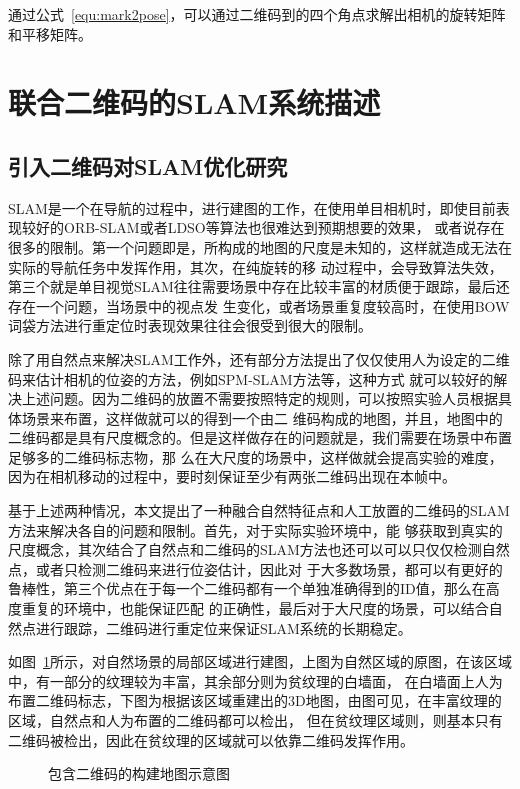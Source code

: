 通过公式~\ref{equ:mark2pose}，可以通过二维码到的四个角点求解出相机的旋转矩阵和平移矩阵。
\section{联合二维码的SLAM系统描述}
\label{sec:2.3}
\subsection{引入二维码对SLAM优化研究}
\label{sec:2.3.1}
SLAM是一个在导航的过程中，进行建图的工作，在使用单目相机时，即使目前表现较好的ORB-SLAM或者LDSO等算法也很难达到预期想要的效果，
或者说存在很多的限制。第一个问题即是，所构成的地图的尺度是未知的，这样就造成无法在实际的导航任务中发挥作用，其次，在纯旋转的移
动过程中，会导致算法失效，第三个就是单目视觉SLAM往往需要场景中存在比较丰富的材质便于跟踪，最后还存在一个问题，当场景中的视点发
生变化，或者场景重复度较高时，在使用BOW词袋方法进行重定位时表现效果往往会很受到很大的限制。

除了用自然点来解决SLAM工作外，还有部分方法提出了仅仅使用人为设定的二维码来估计相机的位姿的方法，例如SPM-SLAM方法等，这种方式
就可以较好的解决上述问题。因为二维码的放置不需要按照特定的规则，可以按照实验人员根据具体场景来布置，这样做就可以的得到一个由二
维码构成的地图，并且，地图中的二维码都是具有尺度概念的。但是这样做存在的问题就是，我们需要在场景中布置足够多的二维码标志物，那
么在大尺度的场景中，这样做就会提高实验的难度，因为在相机移动的过程中，要时刻保证至少有两张二维码出现在本帧中。

基于上述两种情况，本文提出了一种融合自然特征点和人工放置的二维码的SLAM方法来解决各自的问题和限制。首先，对于实际实验环境中，能
够获取到真实的尺度概念，其次结合了自然点和二维码的SLAM方法也还可以可以只仅仅检测自然点，或者只检测二维码来进行位姿估计，因此对
于大多数场景，都可以有更好的鲁棒性，第三个优点在于每一个二维码都有一个单独准确得到的ID值，那么在高度重复的环境中，也能保证匹配
的正确性，最后对于大尺度的场景，可以结合自然点进行跟踪，二维码进行重定位来保证SLAM系统的长期稳定。

如图~\ref{fig:map}所示，对自然场景的局部区域进行建图，上图为自然区域的原图，在该区域中，有一部分的纹理较为丰富，其余部分则为贫纹理的白墙面，
在白墙面上人为布置二维码标志，下图为根据该区域重建出的3D地图，由图可见，在丰富纹理的区域，自然点和人为布置的二维码都可以检出，
但在贫纹理区域则，则基本只有二维码被检出，因此在贫纹理的区域就可以依靠二维码发挥作用。

\begin{figure}[htbp]
  \centering
  \vskip0.5cm
  \caption{包含二维码的构建地图示意图}\label{fig:map}
  \end{figure}


